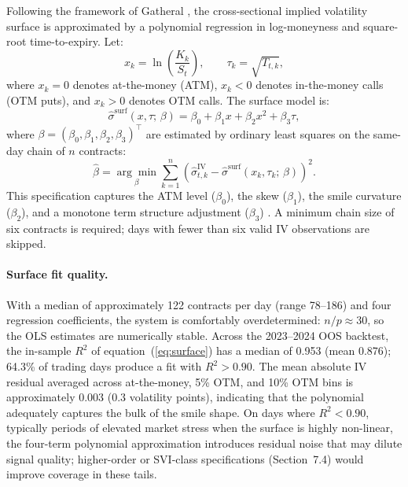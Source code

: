 \documentclass[10pt,twocolumn]{article}
\begin{document}
Following the framework of Gatheral \cite{gatheral2006}, the cross-sectional
implied volatility surface is approximated by a polynomial regression in
log-moneyness and square-root time-to-expiry. Let:
%
\begin{equation}
x_k = \ln\!\left(\frac{K_k}{S_t}\right), \qquad
\tau_k = \sqrt{T_{t,k}},
\end{equation}
%
where $x_k = 0$ denotes at-the-money (ATM), $x_k < 0$ denotes in-the-money
calls (OTM puts), and $x_k > 0$ denotes OTM calls. The surface model is:
%
\begin{equation}
\hat{\sigma}^{\text{surf}}(x, \tau;\,\beta) =
  \beta_0 + \beta_1 x + \beta_2 x^2 + \beta_3 \tau,
\label{eq:surface}
\end{equation}
%
where $\beta = (\beta_0, \beta_1, \beta_2, \beta_3)^{\top}$ are
estimated by ordinary least squares on the same-day chain of $n$ contracts:
%
\begin{equation}
\hat{\beta} = \underset{\beta}{\arg\min}
\sum_{k=1}^{n} \!\left(
  \hat{\sigma}_{t,k}^{\text{IV}}
  - \hat{\sigma}^{\text{surf}}(x_k, \tau_k;\,\beta)
\right)^2.
\end{equation}
%
This specification captures the ATM level ($\beta_0$), the skew ($\beta_1$),
the smile curvature ($\beta_2$), and a monotone term structure adjustment
($\beta_3$) \cite{gatheral2006}. A minimum chain size of six contracts is
required; days with fewer than six valid IV observations are skipped.

\paragraph{Surface fit quality.}
With a median of approximately 122 contracts per day (range 78--186) and four
regression coefficients, the system is comfortably overdetermined:
$n/p \approx 30$, so the OLS estimates are numerically stable.  Across the
2023--2024 OOS backtest, the in-sample $R^2$ of equation~(\ref{eq:surface})
has a median of 0.953 (mean 0.876); 64.3\% of trading days produce a fit
with $R^2 > 0.90$.  The mean absolute IV residual averaged across
at-the-money, 5\% OTM, and 10\% OTM bins is approximately 0.003 (0.3
volatility points), indicating that the polynomial adequately captures the
bulk of the smile shape.  On days where $R^2 < 0.90$, typically periods of
elevated market stress when the surface is highly non-linear, the four-term
polynomial approximation introduces residual noise that may dilute signal
quality; higher-order or SVI-class specifications (Section~7.4) would improve
coverage in these tails.
\end{document}

